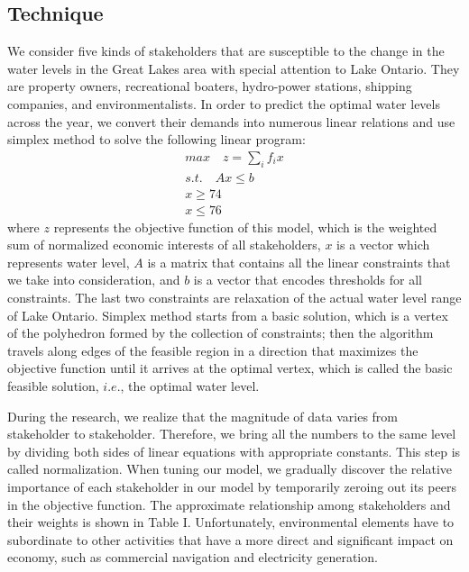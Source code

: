 \documentclass[pre,12pt]{revtex4-1}
\begin{document}
\subsection{Technique}
We consider five kinds of stakeholders that are susceptible to the change in the water levels in the Great Lakes area with special attention to Lake Ontario. They are property owners, recreational boaters, hydro-power stations, shipping companies, and environmentalists. In order to predict the optimal water levels across the year, we convert their demands into numerous linear relations and use simplex method to solve the following linear program: \\ 
\begin{align}
    max\quad z = \sum_{i}{f_{i}x} \\
    s.t. \quad Ax \leq b \\
    x \geq 74 \\
    x \leq 76
\end{align}
where $z$ represents the objective function of this model, which is the weighted sum of normalized economic interests of all stakeholders, $x$ is a vector which represents water level, $A$ is a matrix that contains all the linear constraints that we take into consideration, and $b$ is a vector that encodes thresholds for all constraints. The last two constraints are relaxation of the actual water level range of Lake Ontario. Simplex method starts from a basic solution, which is a vertex of the polyhedron formed by the collection of constraints; then the algorithm travels along edges of the feasible region in a direction that maximizes the objective function until it arrives at the optimal vertex, which is called the basic feasible solution, $i.e.$, the optimal water level. \par
During the research, we realize that the magnitude of data varies from stakeholder to stakeholder. Therefore, we bring all the numbers to the same level by dividing both sides of linear equations with appropriate constants. This step is called normalization. When tuning our model, we gradually discover the relative importance of each stakeholder in our model by temporarily zeroing out its peers in the objective function. The approximate relationship among stakeholders and their weights is shown in Table I. Unfortunately, environmental elements have to subordinate to other activities that have a more direct and significant impact on economy, such as commercial navigation and electricity generation. \\
\end{document}

